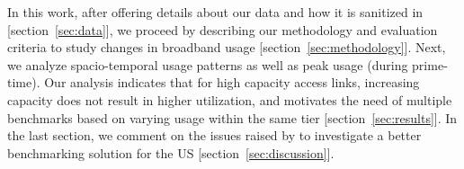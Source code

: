 In this work, after offering details about our data and how it is sanitized in 
[section~\ref{sec:data}], we proceed by describing our methodology and evaluation criteria to study
changes in broadband usage [section~\ref{sec:methodology}]. Next, we analyze spacio-temporal
usage patterns as well as peak usage (during prime-time). Our analysis indicates that for high
capacity access links, increasing capacity does not result in higher utilization, and
motivates the need of multiple benchmarks based on varying usage within the same tier
[section~\ref{sec:results}]. In the last section, we comment on the issues raised by
 \FCC to investigate a better benchmarking solution for the US [section~\ref{sec:discussion}].